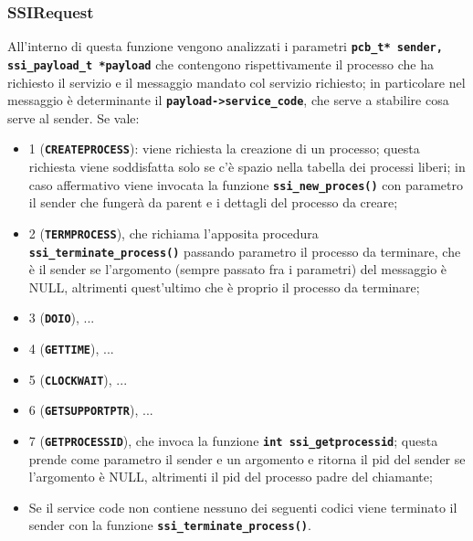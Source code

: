 \documentclass{article}
\begin{document}
\subsubsection{SSIRequest}
All'interno di questa funzione vengono analizzati i parametri \texttt{\textbf{pcb\_t* sender, ssi\_payload\_t *payload}} che contengono rispettivamente il processo che ha richiesto il servizio e il messaggio mandato col servizio richiesto; in particolare nel messaggio è determinante il \texttt{\textbf{payload->service\_code}}, che serve a stabilire cosa serve al sender. Se vale:
\begin{itemize}
    \item 1 (\texttt{\textbf{CREATEPROCESS}}): viene richiesta la creazione di un processo; questa richiesta viene soddisfatta solo se c'è spazio nella tabella dei processi liberi; in caso affermativo viene invocata la funzione \texttt{\textbf{ssi\_new\_proces()}} con parametro il sender che fungerà da parent e i dettagli del processo da creare;

    \item 2 (\texttt{\textbf{TERMPROCESS}}), che richiama l'apposita procedura \texttt{\textbf{ssi\_terminate\_process()}} passando parametro il processo da terminare, che è il sender se l'argomento (sempre passato fra i parametri) del messaggio è NULL, altrimenti quest'ultimo che è proprio il processo da terminare;

    \item 3 (\texttt{\textbf{DOIO}}), ...

    \item 4 (\texttt{\textbf{GETTIME}}), ...

    \item 5 (\texttt{\textbf{CLOCKWAIT}}), ...

    \item 6 (\texttt{\textbf{GETSUPPORTPTR}}), ...

    \item 7 (\texttt{\textbf{GETPROCESSID}}), che invoca la funzione \texttt{\textbf{int ssi\_getprocessid}}; questa prende come parametro il sender e un argomento e ritorna il pid del sender se l'argomento è NULL, altrimenti il pid del processo padre del chiamante; 

    \item Se il service code non contiene nessuno dei seguenti codici viene terminato il sender con la funzione \texttt{\textbf{ssi\_terminate\_process()}}.
\end{itemize} 
\end{document}
